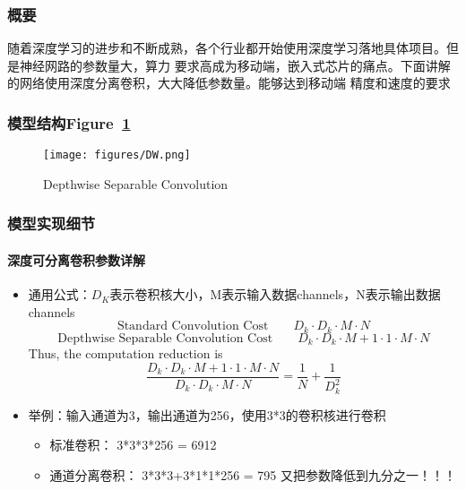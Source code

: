 \documentclass{article}
\begin{document}
\begin{CJK}{UTF8}{gbsn}
\subsubsection{概要}
随着深度学习的进步和不断成熟，各个行业都开始使用深度学习落地具体项目。但是神经网路的参数量大，算力
要求高成为移动端，嵌入式芯片的痛点。下面讲解的网络使用深度分离卷积，大大降低参数量。能够达到移动端
精度和速度的要求


\subsubsection{模型结构Figure~\ref{fig:DW}}
    \begin{figure}[!h]
        \centering
        \texttt{[image: figures/DW.png]}
        \caption{Depthwise Separable Convolution}
        \label{fig:DW}
    \end{figure}


\subsubsection{模型实现细节}
\paragraph{深度可分离卷积参数详解}
    \begin{itemize}
        \item 通用公式：$D_K$表示卷积核大小，M表示输入数据channels，N表示输出数据channels
        \begin{equation}
            \text{Standard Convolution Cost} \qquad D_k \cdot D_k \cdot M \cdot N 
        \end{equation}
        \begin{equation}
            \text{Depthwise Separable Convolution Cost} \qquad  D_k \cdot D_k \cdot M + 1 \cdot 1 \cdot M \cdot N 
        \end{equation}
        Thus, the computation reduction is
        \begin{equation}
            \frac{D_k \cdot D_k \cdot M + 1 \cdot 1 \cdot M \cdot N }{D_k \cdot D_k \cdot M \cdot N } = \frac{1}{N}+\frac{1}{D_k^2}
        \end{equation}
        \item 举例：输入通道为3，输出通道为256，使用3*3的卷积核进行卷积\\
        \begin{itemize}
            \item 标准卷积： 3*3*3*256 = 6912
            \item 通道分离卷积： 3*3*3+3*1*1*256 = 795 \qquad 又把参数降低到九分之一！！！
        \end{itemize}
    \end{itemize}



\end{CJK}
\end{document}
